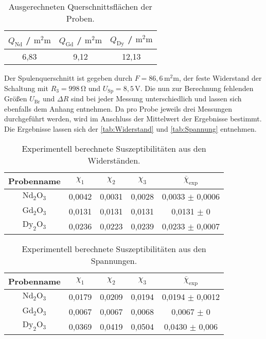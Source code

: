 \begin{table}
  \centering
  \caption{Ausgerechneten Querschnittsflächen der Proben.}
  \label{tab:Querschnitt}
  \begin{tabular}{c | c | c }
    \toprule
    $Q_{\mathrm{Nd}}$ / $\si{\square\milli\meter}$ & $Q_{\mathrm{Gd}}$ / $\si{\square\milli\meter}$ & $Q_{\mathrm{Dy}}$ / $\si{\square\milli\meter}$ \\
    \hline
    6,83 & 9,12 & 12,13 \\
    \midrule
    \bottomrule
  \end{tabular}
\end{table}

Der Spulenquerschnitt ist gegeben durch $F = 86,6 \, \si{\square\milli\meter}$, der feste
Widerstand der Schaltung mit $R_3 = 998\,  \si{\ohm}$ und $U_{\mathrm{Sp}}= 8,5 \, \si{\volt}$.
Die nun zur Berechnung fehlenden Größen
$U_{\mathrm{Br}}$ und $\Delta R$ sind bei jeder Messung unterschiedlich
und lassen sich ebenfalls dem Anhang entnehmen. Da pro Probe jeweils drei Messungen 
durchgeführt werden, wird im Anschluss der Mittelwert der Ergebnisse bestimmt. Die Ergebnisse
lassen sich der \autoref{tab:Widerstand} und \autoref{tab:Spannung} entnehmen.\\

\begin{table}
  \centering
  \caption{Experimentell berechnete Suszeptibilitäten aus den Widerständen.}
  \label{tab:Widerstand}
  \begin{tabular}{c || c | c | c || c }
    \toprule
    Probenname & $\chi_1$ & $\chi_2$ & $\chi_3$ & $\overline{\chi}_{\mathrm{exp}}$ \\
    \hline
    $\mathrm{Nd}_2 \mathrm{O}_3$ & 0,0042 & 0,0031 & 0,0028 & 0,0033 $\pm$ 0,0006 \\
    $\mathrm{Gd}_2 \mathrm{O}_3$ & 0,0131 & 0,0131 & 0,0131 & 0,0131 $\pm$ 0 \\
    $\mathrm{Dy}_2 \mathrm{O}_3$ & 0,0236 & 0,0223 & 0,0239 & 0,0233 $\pm$ 0,0007 \\
    \midrule
    \bottomrule
  \end{tabular}
\end{table}

\begin{table}
  \centering
  \caption{Experimentell berechnete Suszeptibilitäten aus den Spannungen.}
  \label{tab:Spannung}
  \begin{tabular}{c || c | c | c || c }
    \toprule
    Probenname & $\chi_1$ & $\chi_2$ & $\chi_3$ & $\overline{\chi}_{\mathrm{exp}}$ \\
    \hline
    $\mathrm{Nd}_2 \mathrm{O}_3$ & 0,0179 & 0,0209 & 0,0194 & 0,0194 $\pm$ 0,0012 \\
    $\mathrm{Gd}_2 \mathrm{O}_3$ & 0,0067 & 0,0067 & 0,0068 & 0,0067 $\pm$ 0 \\
    $\mathrm{Dy}_2 \mathrm{O}_3$ & 0,0369 & 0,0419 & 0,0504 & 0,0430 $\pm$ 0,006 \\
    \midrule
    \bottomrule
  \end{tabular}
\end{table}

